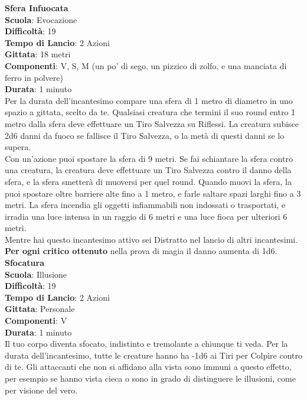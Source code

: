 \begin{multicols}{2}
\medskip\textbf{Sfera Infuocata}\\
\textbf{Scuola}: Evocazione\\
\textbf{Difficoltà}: 19\\
\textbf{Tempo di Lancio}: 2 Azioni\\
\textbf{Gittata}: 18 metri\\
\textbf{Componenti}: V, S, M (un po' di sego, un pizzico di zolfo, e una manciata di ferro in polvere)\\
\textbf{Durata}: 1 minuto\\
Per la durata dell'incantesimo compare una sfera di 1 metro di diametro in uno spazio a gittata, scelto da te. Qualsiasi creatura che termini il suo round entro 1 metro dalla sfera deve effettuare un Tiro Salvezza su Riflessi. La creatura subisce 2d6 danni da fuoco se fallisce il Tiro Salvezza, o la metà di questi danni se lo supera.\\
Con un'azione puoi spostare la sfera di 9 metri. Se fai schiantare la sfera contro una creatura, la creatura deve effettuare un Tiro Salvezza contro il danno della sfera, e la sfera smetterà di muoversi per quel round.
Quando muovi la sfera, la puoi spostare oltre barriere alte fino a 1 metro, e farle saltare spazi larghi fino a 3 metri. La sfera incendia gli oggetti infiammabili non indossati o trasportati, e irradia una luce intensa in un raggio di 6 metri e una luce fioca per ulteriori 6 metri.\\
Mentre hai questo incantesimo attivo sei Distratto nel lancio di altri incantesimi.\\
\textbf{Per ogni critico ottenuto} nella prova di magia il danno aumenta di 1d6.\\

\medskip\textbf{Sfocatura}\\
\textbf{Scuola}: Illusione\\
\textbf{Difficoltà}: 19\\
\textbf{Tempo di Lancio}: 2 Azioni\\
\textbf{Gittata}: Personale\\
\textbf{Componenti}: V\\
\textbf{Durata}: 1 minuto \\
Il tuo corpo diventa sfocato, indistinto e tremolante a chiunque ti veda. Per la durata dell'incantesimo, tutte le creature hanno ha -1d6 ai Tiri per Colpire contro di te. Gli attaccanti che non si affidano alla vista sono immuni a questo effetto, per esempio se hanno vista cieca o sono in grado di distinguere le illusioni, come per visione del vero.


\end{multicols}
